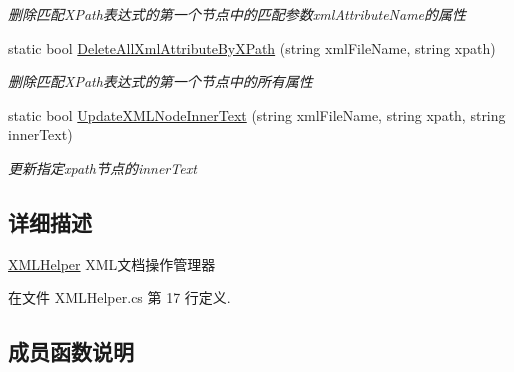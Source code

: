 \begin{DoxyCompactItemize}
\begin{DoxyCompactList}\small\item\em 删除匹配\+X\+Path表达式的第一个节点中的匹配参数xml\+Attribute\+Name的属性 \end{DoxyCompactList}\item 
static bool \hyperlink{class_x_c_l_net_tools_1_1_x_m_l_1_1_x_m_l_helper_a07059a8c89a84c359cc9893c842a263e}{Delete\+All\+Xml\+Attribute\+By\+X\+Path} (string xml\+File\+Name, string xpath)
\begin{DoxyCompactList}\small\item\em 删除匹配\+X\+Path表达式的第一个节点中的所有属性 \end{DoxyCompactList}\item 
static bool \hyperlink{class_x_c_l_net_tools_1_1_x_m_l_1_1_x_m_l_helper_a680dbf5fec70c3e5e30d0f75fedc2d3c}{Update\+X\+M\+L\+Node\+Inner\+Text} (string xml\+File\+Name, string xpath, string inner\+Text)
\begin{DoxyCompactList}\small\item\em 更新指定xpath节点的inner\+Text \end{DoxyCompactList}\end{DoxyCompactItemize}


\subsection{详细描述}
\hyperlink{class_x_c_l_net_tools_1_1_x_m_l_1_1_x_m_l_helper}{X\+M\+L\+Helper} X\+M\+L文档操作管理器 



在文件 X\+M\+L\+Helper.\+cs 第 17 行定义.



\subsection{成员函数说明}
